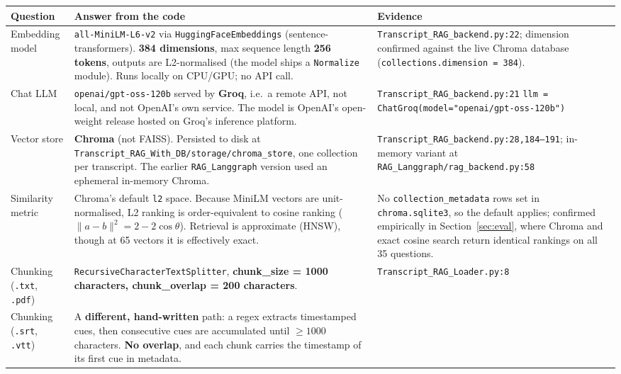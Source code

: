 \documentclass[11pt,a4paper]{article}
\begin{document}
\begin{longtable}{@{}p{3.6cm}p{7.3cm}p{4.6cm}@{}}
\toprule
\textbf{Question} & \textbf{Answer from the code} & \textbf{Evidence} \\
\midrule
\endhead
Embedding model &
\texttt{all-MiniLM-L6-v2} via \texttt{HuggingFaceEmbeddings}
(sentence-transformers). \textbf{384 dimensions}, max sequence length
\textbf{256 tokens}, outputs are L2-normalised (the model ships a
\texttt{Normalize} module). Runs locally on CPU/GPU; no API call. &
\texttt{Transcript\_RAG\_backend.py:22}; dimension confirmed against the live
Chroma database (\texttt{collections.dimension = 384}). \\
\addlinespace
Chat LLM &
\texttt{openai/gpt-oss-120b} served by \textbf{Groq}, i.e.\ a remote API, not
local, and not OpenAI's own service. The model is OpenAI's open-weight release
hosted on Groq's inference platform. &
\texttt{Transcript\_RAG\_backend.py:21}\newline
\texttt{llm = ChatGroq(model="openai/gpt-oss-120b")} \\
\addlinespace
Vector store &
\textbf{Chroma} (not FAISS). Persisted to disk at
\texttt{Transcript\_RAG\_With\_DB/storage/chroma\_store}, one collection per
transcript. The earlier \texttt{RAG\_Langgraph} version used an ephemeral
in-memory Chroma. &
\texttt{Transcript\_RAG\_backend.py:28,184--191};\newline
in-memory variant at \texttt{RAG\_Langgraph/rag\_backend.py:58} \\
\addlinespace
Similarity metric &
Chroma's default \texttt{l2} space. Because MiniLM vectors are unit-normalised,
L2 ranking is order-equivalent to cosine ranking
($\lVert a-b\rVert^2 = 2-2\cos\theta$). Retrieval is approximate (HNSW), though
at 65 vectors it is effectively exact. &
No \texttt{collection\_metadata} rows set in
\texttt{chroma.sqlite3}, so the default applies; confirmed empirically in
Section~\ref{sec:eval}, where Chroma and exact cosine search return identical
rankings on all 35 questions. \\
\addlinespace
Chunking (\texttt{.txt}, \texttt{.pdf}) &
\texttt{RecursiveCharacterTextSplitter}, \textbf{chunk\_size = 1000 characters,
chunk\_overlap = 200 characters}. &
\texttt{Transcript\_RAG\_Loader.py:8} \\
\addlinespace
Chunking (\texttt{.srt}, \texttt{.vtt}) &
A \textbf{different, hand-written} path: a regex extracts timestamped cues, then
consecutive cues are accumulated until $\geq 1000$ characters. \textbf{No
overlap}, and each chunk carries the timestamp of its first cue in metadata. &

\end{longtable}
\end{document}

